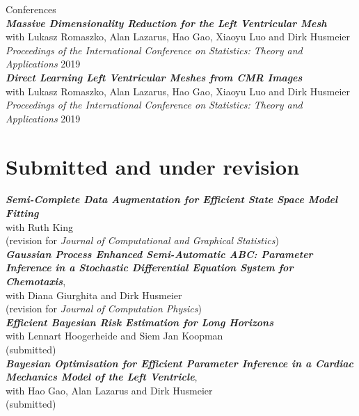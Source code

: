 \documentclass[margin,line]{resume}
\begin{document}
\begin{resume}
\pagebreak
{\mysidestyle Conferences}  \vspace{1mm}\\	
\textit{\textbf{Massive Dimensionality Reduction for the Left Ventricular Mesh}}\\
	with Lukasz Romaszko, Alan Lazarus, Hao Gao, Xiaoyu Luo and Dirk Husmeier\\
	\textit{Proceedings of the International Conference on Statistics: Theory and Applications} 2019  \vspace{2mm}\\
\textit{\textbf{Direct Learning Left Ventricular Meshes from CMR Images}}\\
	with Lukasz Romaszko, Alan Lazarus, Hao Gao, Xiaoyu Luo and Dirk Husmeier\\
	\textit{Proceedings of the International Conference on Statistics: Theory and Applications} 2019 \vspace{1mm} \\

%
\vspace{-5mm}    
\section{\mysidestyle Submitted and under revision}	
\textit{\textbf{Semi-Complete Data Augmentation for Efficient State Space Model Fitting}}\\ 
    with Ruth King \\
    (revision for \textit{Journal of Computational and Graphical Statistics})\vspace{2mm} \\   
\textit{\textbf{Gaussian Process Enhanced Semi-Automatic ABC: Parameter Inference in a Stochastic Differential Equation System for Chemotaxis}},\\ 
    with Diana Giurghita and Dirk Husmeier \\
    (revision for \textit{Journal of Computation Physics}) \vspace{2 mm}\\
\textit{\textbf{Efficient Bayesian Risk Estimation for Long Horizons}}\\
	with Lennart Hoogerheide and Siem Jan Koopman\\
	(submitted)\vspace{2 mm} \\ 
\textit{\textbf{Bayesian Optimisation for Efficient Parameter Inference in a Cardiac Mechanics Model of the Left Ventricle}},\\ 
    with Hao Gao, Alan Lazarus and Dirk Husmeier \\
    (submitted) \\



\end{resume}
\end{document}
